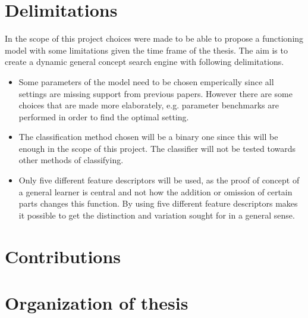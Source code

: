 \section{Delimitations}
\label{sec:intro:delimitations}
In the scope of this project choices were made to be able to propose a functioning model with some limitations given the time frame of the thesis. The aim is to create a dynamic general concept search engine with following delimitations.
\begin{itemize}
	\item Some parameters of the model need to be chosen emperically since all settings are missing support from previous papers. However there are some choices that are made more elaborately, e.g. parameter benchmarks are performed in order to find the optimal setting. 
	\item The classification method chosen will be a binary one since this will be enough in the scope of this project. The classifier will not be tested towards other methods of classifying.
	\item Only five different feature descriptors will be used, as the proof of concept of a general learner is central and not how the addition or omission of certain parts changes this function. By using five different feature descriptors makes it possible to get the distinction and variation sought for in a general sense.
\end{itemize}

\section{Contributions}
\section{Organization of thesis}

